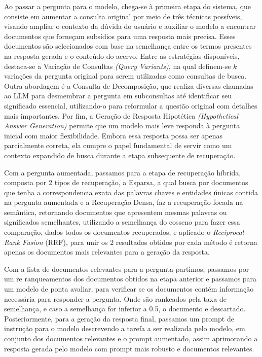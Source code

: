 Ao passar a pergunta para o modelo, chega-se à primeira etapa do sistema, que consiste em aumentar a consulta original por meio de três técnicas possíveis, visando ampliar o contexto da dúvida do usuário e auxiliar o modelo a encontrar documentos que forneçam subsídios para uma resposta mais precisa. Esses documentos são selecionados com base na semelhança entre os termos presentes na resposta gerada e o conteúdo do acervo. Entre as estratégias disponíveis, destaca-se a Variação de Consultas \textit{(Query Variants)}, na qual definem-se $k$ variações da pergunta original para serem utilizadas como consultas de busca. Outra abordagem é a Consulta de Decomposição, que realiza diversas chamadas ao LLM para desmembrar a pergunta em subconsultas até identificar seu significado essencial, utilizando-o para reformular a questão original com detalhes mais importantes. Por fim, a Geração de Resposta Hipotética \textit{(Hypothetical Answer Generation)} permite que um modelo mais leve responda à pergunta inicial com maior flexibilidade. Embora essa resposta possa ser apenas parcialmente correta, ela cumpre o papel fundamental de servir como um contexto expandido de busca durante a etapa subsequente de recuperação.

Com a pergunta aumentada, passamos para a etapa de recuperação híbrida, composta por 2 tipos de recuperação,  a Esparsa, a qual busca por documentos que tenha a correspondencia exata das palavras chaves e entidades únicas contida na pergunta aumentada e a Recuperação Densa, faz a recuperação focada na semântica, retornando documentos que apresentem mesmas palavras ou significados semelhantes, utilizando a semelhança do cosseno para fazer essa comparação, dados todos os documentos recuperados, e aplicado o \textit{Reciprocal Rank Fusion} (RRF), para unir os 2 resultados obtidos por cada método é retorna apenas os documentos mais relevantes para a geração da resposta.

Com a lista de documentos relevantes para a pergunta partimos, passamos por um re ranqueamentos dos documentos obtidos na etapa anterior e passamos para um modelo de ponta avaliar, para verificar se os documentos contém informação necessária para responder a pergunta. Onde são rankeados pela taxa de semelhança, e caso a semelhança for inferior a 0.5, o documento e descartado. Posteriormente, para a geração da resposta final, passamos um prompt de instrução para o modelo descrevendo a tarefa a ser realizada pelo modelo, em conjunto dos documentos relevantes e o prompt aumentado, assim aprimorando a resposta gerada pelo modelo com prompt mais robusto e documentos relevantes.


